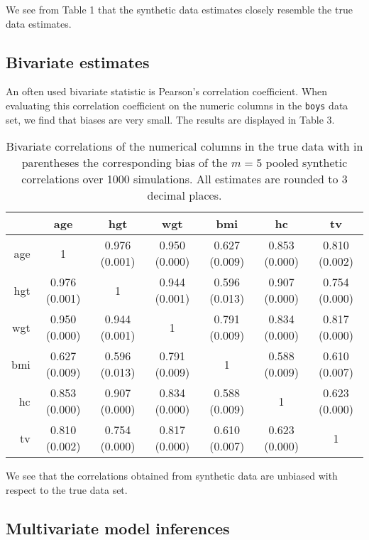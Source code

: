 \documentclass[psych,article,submit,moreauthors,pdftex]{mdpi}
\begin{document}
We see from Table 1 that the synthetic data estimates closely resemble
the true data estimates.

\hypertarget{bivariate-estimates}{%
\subsection{Bivariate estimates}\label{bivariate-estimates}}

An often used bivariate statistic is Pearson's correlation coefficient.
When evaluating this correlation coefficient on the numeric columns in
the \texttt{boys} data set, we find that biases are very small. The
results are displayed in Table 3.

\begin{table}[H]
\caption{Bivariate correlations of the numerical columns in the true data with in parentheses the corresponding bias of the $m=5$ pooled synthetic correlations over 1000 simulations. All estimates are rounded to 3 decimal places. }
\centering
\begin{tabular}{rcccccc}
  \hline
 & age & hgt & wgt & bmi & hc & tv \\ 
  \hline
age & 1 & 0.976 (0.001) & 0.950 (0.000) & 0.627 (0.009) & 0.853 (0.000) & 0.810 (0.002) \\ 
  hgt & 0.976 (0.001) & 1 & 0.944 (0.001) & 0.596 (0.013) & 0.907 (0.000) & 0.754 (0.000) \\ 
  wgt & 0.950 (0.000) & 0.944 (0.001) & 1 & 0.791 (0.009) & 0.834 (0.000) & 0.817 (0.000) \\ 
  bmi & 0.627 (0.009) & 0.596 (0.013) & 0.791 (0.009) & 1 & 0.588 (0.009) & 0.610 (0.007) \\ 
  hc & 0.853 (0.000) & 0.907 (0.000) & 0.834 (0.000) & 0.588 (0.009) & 1 & 0.623 (0.000) \\ 
  tv & 0.810 (0.002) & 0.754 (0.000) & 0.817 (0.000) & 0.610 (0.007) & 0.623 (0.000) & 1 \\ 
   \hline
\end{tabular}
\end{table}

We see that the correlations obtained from synthetic data are unbiased
with respect to the true data set.

\hypertarget{multivariate-model-inferences}{%
\subsection{Multivariate model
inferences}\label{multivariate-model-inferences}}
\end{document}
